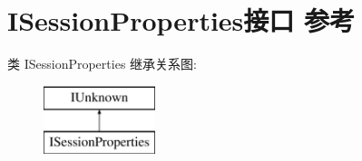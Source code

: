 \hypertarget{interface_i_session_properties}{}\section{I\+Session\+Properties接口 参考}
\label{interface_i_session_properties}
类 I\+Session\+Properties 继承关系图\+:\begin{figure}[H]
\begin{center}
\leavevmode
\includegraphics[height=2.000000cm]{interface_i_session_properties}
\end{center}
\end{figure}

